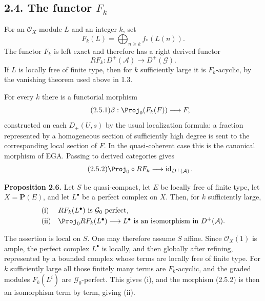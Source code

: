 \subsection*{2.4. The functor \(F_k\)}
For an \(\mathcal O_X\)-module \(L\) and an integer \(k\), set
\begin{equation}\tag{2.4.1}
  F_k(L)=\bigoplus_{n\geq k} f_*(L(n)).
\end{equation}
The functor \(F_k\) is left exact and therefore has a right derived functor
\begin{equation}\tag{2.4.2}
  RF_k:D^+(\mathcal A)\longrightarrow D^+(\mathcal G).
\end{equation}
If \(L\) is locally free of finite type, then for \(k\) sufficiently large it is \(F_k\)-acyclic, by the vanishing theorem used above in 1.3.

For every \(k\) there is a functorial morphism
\begin{equation}\tag{2.5.1}
  \beta:\Proj_0(F_k(F))\longrightarrow F,
\end{equation}
constructed on each \(D_+(U,s)\) by the usual localization formula: a fraction represented by a homogeneous section of sufficiently high degree is sent to the corresponding local section of \(F\). In the quasi-coherent case this is the canonical morphism of EGA. Passing to derived categories gives
\begin{equation}\tag{2.5.2}
  \Proj_0\circ RF_k \longrightarrow \operatorname{id}_{D^+(\mathcal A)}.
\end{equation}

\textbf{Proposition 2.6.} Let \(S\) be quasi-compact, let \(E\) be locally free of finite type, let \(X=\mathbf P(E)\), and let \(L^\bullet\) be a perfect complex on \(X\). Then, for \(k\) sufficiently large,
\[
\begin{array}{ll}
\text{\rm (i)}& RF_k(L^\bullet)\text{ is }\mathcal G_0\text{-perfect},\\[1mm]
\text{\rm (ii)}& \Proj_0 RF_k(L^\bullet)\longrightarrow L^\bullet
\text{ is an isomorphism in }D^+(\mathcal A).
\end{array}
\]

The assertion is local on \(S\). One may therefore assume \(S\) affine. Since \(\mathcal O_X(1)\) is ample, the perfect complex \(L^\bullet\) is locally, and then globally after refining, represented by a bounded complex whose terms are locally free of finite type. For \(k\) sufficiently large all those finitely many terms are \(F_k\)-acyclic, and the graded modules \(F_k(L^i)\) are \(\mathcal G_0\)-perfect. This gives (i), and the morphism (2.5.2) is then an isomorphism term by term, giving (ii).

